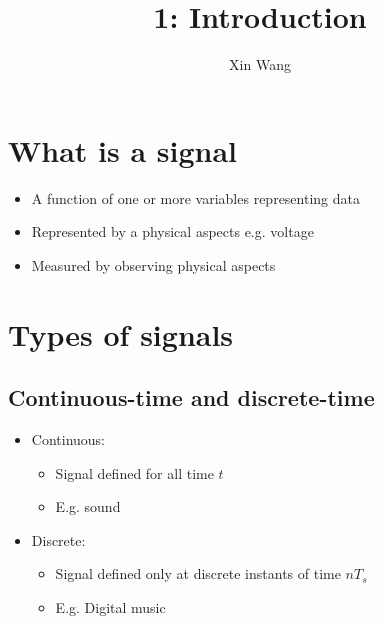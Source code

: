 \documentclass[conference]{IEEEtran}
\begin{document}
\title{1: Introduction}
\author{Xin Wang}
\maketitle
\section{What is a signal}
\begin{itemize}
  \item A function of one or more variables representing data
  \item Represented by a physical aspects e.g. voltage
  \item Measured by observing physical aspects
\end{itemize}

\section{Types of signals}
\subsection{Continuous-time and discrete-time}

\begin{itemize}
  \item Continuous: 
  \begin{itemize}
    \item Signal defined for all time $t$
    \item E.g. sound
  \end{itemize}
  \item Discrete: 
  \begin{itemize}
    \item Signal defined only at discrete instants of time $nT_s$
    \item E.g. Digital music
  \end{itemize}
\end{itemize}
\end{document}

